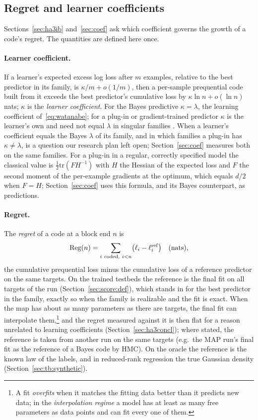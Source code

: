\documentclass[11pt,a4paper]{article}
\begin{document}
\subsection{Regret and learner coefficients}
\label{sec:regretdef}

Sections~\ref{sec:ha3ib} and~\ref{sec:coef} ask which coefficient governs the growth of a code's regret. The quantities are defined here once.

\paragraph{Learner coefficient.} If a learner's expected excess log loss after $m$ examples, relative to the best predictor in its family, is $\kappa/m+o(1/m)$, then a per-sample prequential code built from it exceeds the best predictor's cumulative loss by $\kappa\ln n+o(\ln n)$ nats; $\kappa$ is the \emph{learner coefficient}. For the Bayes predictive $\kappa=\lambda$, the learning coefficient of~\eqref{eq:watanabe}; for a plug-in or gradient-trained predictor $\kappa$ is the learner's own and need not equal $\lambda$ in singular families \cite{watanabe2009}. When a learner's coefficient equals the Bayes $\lambda$ of its family, and in which families a plug-in has $\kappa\ne\lambda$, is a question our research plan left open; Section~\ref{sec:coef} measures both on the same families. For a plug-in in a regular, correctly specified model the classical value is $\tfrac12\mathrm{tr}(FH^{-1})$ with $H$ the Hessian of the expected loss and $F$ the second moment of the per-example gradients at the optimum, which equals $d/2$ when $F=H$; Section~\ref{sec:coef} uses this formula, and its Bayes counterpart, as predictions.

\paragraph{Regret.} The \emph{regret} of a code at a block end $n$ is
\begin{equation}
\mathrm{Reg}(n)=\sum_{i\ \text{coded},\ i<n}\bigl(\ell_i-\ell^{\rm ref}_i\bigr)\quad\text{(nats)},
\label{eq:regret}
\end{equation}
the cumulative prequential loss minus the cumulative loss of a reference predictor on the same targets. On the trained testbeds the reference is the final fit on all targets of the run (Section~\ref{sec:score:def}), which stands in for the best predictor in the family, exactly so when the family is realizable and the fit is exact. When the map has about as many parameters as there are targets, the final fit can interpolate them,\footnote{A fit \emph{overfits} when it matches the fitting data better than it predicts new data; in the \emph{interpolation regime} a model has at least as many free parameters as data points and can fit every one of them.} and the regret measured against it is then flat for a reason unrelated to learning coefficients (Section~\ref{sec:ha3concl}); where stated, the reference is taken from another run on the same targets (e.g.\ the MAP run's final fit as the reference of a Bayes code by HMC). On the oracle the reference is the known law of the labels, and in reduced-rank regression the true Gaussian density (Section~\ref{sec:tb:synthetic}).
\end{document}
